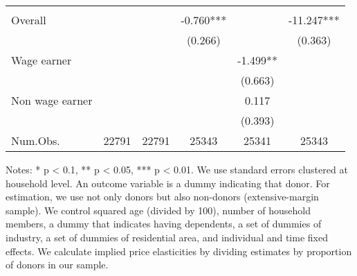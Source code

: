 \begin{table}
\begin{threeparttable}
\begin{tabular}[t]{lccccc}
\midrule
\addlinespace[0.3em]
\multicolumn{6}{l}{\textit{Implied price elasticity}}\\
\hspace{1em}Overall &  &  & -0.760*** &  & -11.247***\\
\hspace{1em} &  &  & (0.266) &  & (0.363)\\
\hspace{1em}Wage earner &  &  &  & -1.499** & \\
\hspace{1em} &  &  &  & (0.663) & \\
\hspace{1em}Non wage earner &  &  &  & 0.117 & \\
\hspace{1em} &  &  &  & (0.393) & \\
Num.Obs. & \num{22791} & \num{22791} & \num{25343} & \num{25341} & \num{25343}\\
\bottomrule
\end{tabular}
\begin{tablenotes}
\item Notes: * p < 0.1, ** p < 0.05, *** p < 0.01. We use standard errors clustered at household level. An outcome variable is a dummy indicating that donor. For estimation, we use not only donors but also non-donors (extensive-margin sample). We control squared age (divided by 100), number of household members, a dummy that indicates having dependents, a set of dummies of industry, a set of dummies of residential area, and individual and time fixed effects. We calculate implied price elasticities by dividing estimates by proportion of donors in our sample.
\end{tablenotes}
\end{threeparttable}
\end{table}
